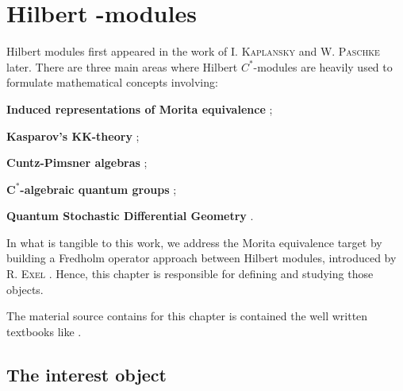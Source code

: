 \chapter[Hilbert \texorpdfstring{\ensuremath{C^*}}{C*}-modules]{Hilbert \texorpdfstring{}{C*}-modules}
\label{ch:hilbert modules}

Hilbert modules first appeared in the work of \textsc{I. Kaplansky} \cite{kaplansky1953modules} and \textsc{W. Paschke} \cite{paschke1973inner} later. There are three main areas where Hilbert $C^*$-modules are heavily used to formulate mathematical concepts involving:
\begin{itroman}
    \item\label{main areas (i)} \textbf{Induced representations of Morita equivalence} \cite{brown1977stable, RIEFFEL1974176,rieffel1981c};
    \item \textbf{Kasparov's $\mathbf{KK}$-theory} \cite{kasparov1980stinespring};
    
    \item \textbf{Cuntz-Pimsner algebras} \cite{Schafhauser2015CuntzPimsner, robertson2011extensions, browlowe2004exel}; %
    \item \textbf{$\mathbf{C^*}$-algebraic quantum groups} \cite{woronowicz1991unbounded, abadie1996hilbert};
    \item \textbf{Quantum Stochastic Differential Geometry} \cite{applebaum1988quantum}.
\end{itroman}

In what is tangible to this work, we address the Morita equivalence target by building a Fredholm operator approach between Hilbert modules, introduced by \textsc{R. Exel} \cite{exel7fredholm}. Hence, this chapter is responsible for defining and studying those objects.

The material source contains for this chapter is contained the well written textbooks like \cite{lance1995hilbert,jensen2012elements, manuilov2001hilbert}.

\section{The interest object}
\label{sec:definicao de hilbert c-star-modules}

